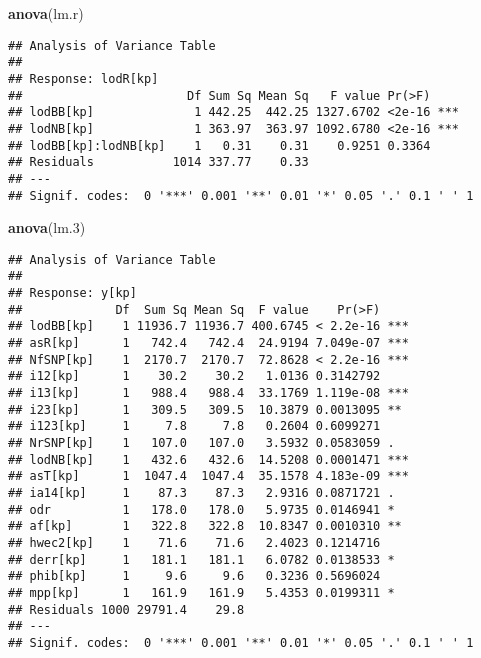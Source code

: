\documentclass[]{article}
\newenvironment{Shaded}{\begin{snugshade}}{\end{snugshade}}
\newcommand{\KeywordTok}[1]{\textcolor[rgb]{0.13,0.29,0.53}{\textbf{#1}}}
\newcommand{\DecValTok}[1]{\textcolor[rgb]{0.00,0.00,0.81}{#1}}
\newcommand{\NormalTok}[1]{#1}
\begin{document}
\begin{Shaded}
\begin{Highlighting}[]
\KeywordTok{anova}\NormalTok{(lm.r)}
\end{Highlighting}
\end{Shaded}

\begin{verbatim}
## Analysis of Variance Table
## 
## Response: lodR[kp]
##                       Df Sum Sq Mean Sq   F value Pr(>F)    
## lodBB[kp]              1 442.25  442.25 1327.6702 <2e-16 ***
## lodNB[kp]              1 363.97  363.97 1092.6780 <2e-16 ***
## lodBB[kp]:lodNB[kp]    1   0.31    0.31    0.9251 0.3364    
## Residuals           1014 337.77    0.33                     
## ---
## Signif. codes:  0 '***' 0.001 '**' 0.01 '*' 0.05 '.' 0.1 ' ' 1
\end{verbatim}

\begin{Shaded}
\begin{Highlighting}[]
\KeywordTok{anova}\NormalTok{(lm.}\DecValTok{3}\NormalTok{)}
\end{Highlighting}
\end{Shaded}

\begin{verbatim}
## Analysis of Variance Table
## 
## Response: y[kp]
##             Df  Sum Sq Mean Sq  F value    Pr(>F)    
## lodBB[kp]    1 11936.7 11936.7 400.6745 < 2.2e-16 ***
## asR[kp]      1   742.4   742.4  24.9194 7.049e-07 ***
## NfSNP[kp]    1  2170.7  2170.7  72.8628 < 2.2e-16 ***
## i12[kp]      1    30.2    30.2   1.0136 0.3142792    
## i13[kp]      1   988.4   988.4  33.1769 1.119e-08 ***
## i23[kp]      1   309.5   309.5  10.3879 0.0013095 ** 
## i123[kp]     1     7.8     7.8   0.2604 0.6099271    
## NrSNP[kp]    1   107.0   107.0   3.5932 0.0583059 .  
## lodNB[kp]    1   432.6   432.6  14.5208 0.0001471 ***
## asT[kp]      1  1047.4  1047.4  35.1578 4.183e-09 ***
## ia14[kp]     1    87.3    87.3   2.9316 0.0871721 .  
## odr          1   178.0   178.0   5.9735 0.0146941 *  
## af[kp]       1   322.8   322.8  10.8347 0.0010310 ** 
## hwec2[kp]    1    71.6    71.6   2.4023 0.1214716    
## derr[kp]     1   181.1   181.1   6.0782 0.0138533 *  
## phib[kp]     1     9.6     9.6   0.3236 0.5696024    
## mpp[kp]      1   161.9   161.9   5.4353 0.0199311 *  
## Residuals 1000 29791.4    29.8                       
## ---
## Signif. codes:  0 '***' 0.001 '**' 0.01 '*' 0.05 '.' 0.1 ' ' 1
\end{verbatim}
\end{document}
